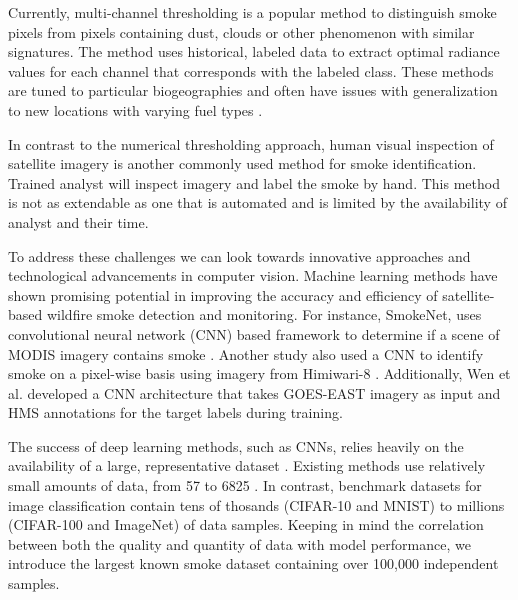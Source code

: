 \documentclass{ametsocV6.1}
\begin{document}
Currently, multi-channel thresholding is a popular method to distinguish smoke pixels from pixels containing dust, clouds or other phenomenon with similar signatures. The method uses historical, labeled data to extract optimal radiance values for each channel that corresponds with the labeled class. These methods are tuned to particular biogeographies and often have issues with generalization to new locations with varying fuel types \citep{thresh_geog}.

In contrast to the numerical thresholding approach, human visual inspection of satellite imagery is another commonly used method for smoke identification. Trained analyst will inspect imagery and label the smoke by hand. This method is not as extendable as one that is automated and is limited by the availability of analyst and their time.


To address these challenges we can look towards innovative approaches and technological advancements in computer vision. Machine learning methods have shown promising potential in improving the accuracy and efficiency of satellite-based wildfire smoke detection and monitoring. For instance, SmokeNet, uses convolutional neural network (CNN) based framework to determine if a scene of MODIS imagery contains smoke \citep{smokenet}. Another study also used a CNN to identify smoke on a pixel-wise basis
using imagery from Himiwari-8 \citep{larsen}. Additionally, Wen et al. developed a CNN architecture that takes GOES-EAST imagery as input and HMS annotations for the target labels during training\citep{smoke_goes}. 



The success of deep learning methods, such as CNNs, relies heavily on the availability of a large, representative dataset \citep{data_size}. Existing methods use relatively small amounts of data, from 57 \citep{wang} to 6825 \citep{smoke_goes}. In contrast, benchmark datasets for image classification contain tens of thosands (CIFAR-10 and MNIST) to millions (CIFAR-100 and ImageNet) of data samples. Keeping in mind the correlation between both the quality and quantity of data with model performance, we
introduce the largest known smoke dataset containing over 100,000 independent samples.
\end{document}
